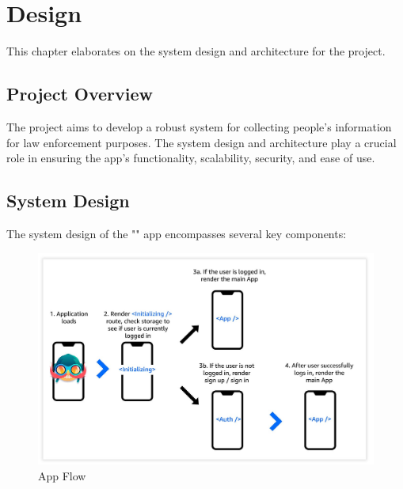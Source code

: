 \chapter{Design}
\justify

This chapter elaborates on the system design and architecture for the {\myprojectname} project.

\section{Project Overview}

The {\myprojectname} project aims to develop a robust system for collecting people's information for law enforcement purposes. The system design and architecture play a crucial role in ensuring the app's functionality, scalability, security, and ease of use.

\section{System Design}

The system design of the "{\myprojectname}" app encompasses several key components:

\begin{figure}
    \centering
    \includegraphics[width=1\linewidth]{Media//appFlow.jpg}
    \caption{App Flow}
    \label{fig:App Flow}
\end{figure}


